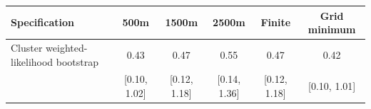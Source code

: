 \begin{tabular}{lccccc}
\toprule
Specification & 500m & 1500m & 2500m & Finite & Grid minimum \\
\midrule
Cluster weighted-likelihood bootstrap & 0.43 & 0.47 & 0.55 & 0.47 & 0.42 \\
 & [0.10, 1.02] & [0.12, 1.18] & [0.14, 1.36] & [0.12, 1.18] & [0.10, 1.01] \\
\bottomrule
\end{tabular}
